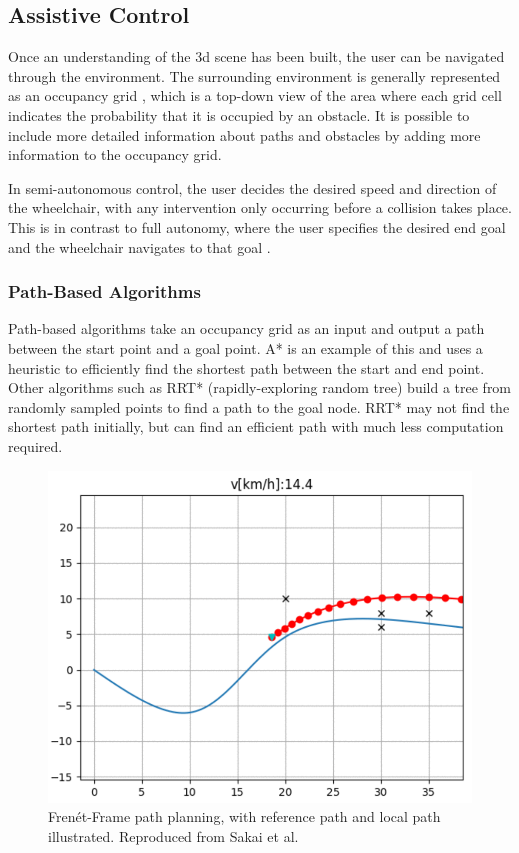 

\pagebreak
\subsection{Assistive Control}
Once an understanding of the 3d scene has been built, the user can be navigated through the environment.
The surrounding environment is generally represented as an occupancy grid \cite{elfesUsingOccupancyGrids1989},
which is a top-down view of the area where each grid cell indicates the probability that it is occupied
by an obstacle. It is possible to include more detailed information about
paths and obstacles by adding more information to the occupancy grid.

In semi-autonomous control, the user decides the desired speed and direction of the wheelchair, with any intervention only
occurring before a collision takes place. This is in contrast to full autonomy, where the user specifies the
desired end goal and the wheelchair navigates to that goal \cite{wangS2P2SelfSupervisedGoalDirected2021}.

\subsubsection{Path-Based Algorithms}
Path-based algorithms take an occupancy grid as an input and output a path between the start point and a goal point.
A* is an example of this and uses a heuristic to efficiently find the shortest path between the start and end point.
Other algorithms such as RRT* (rapidly-exploring random tree) \cite{karamanSamplingbasedAlgorithmsOptimal2011} build a tree from randomly sampled points
to find a path to the goal node. RRT* may not find the shortest path initially, but can find an efficient path with much less
computation required.

\begin{figure}[b]
    \centering
    \includegraphics[width=0.5\linewidth]{images/frenet_frame_local_path.png}
    \caption{Fren\'et-Frame path planning, with reference path and local path illustrated. Reproduced from Sakai et al. \cite{sakaiPythonRoboticsPythonCode2018}}
    \label{fig:frenet_frame_local_path}
\end{figure}


